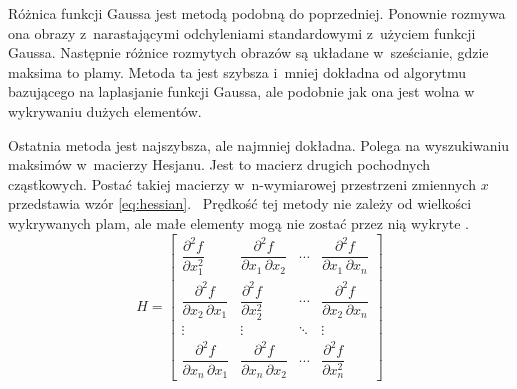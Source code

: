 Różnica funkcji Gaussa jest metodą podobną do poprzedniej.
Ponownie rozmywa ona obrazy z~narastającymi odchyleniami standardowymi z~użyciem
funkcji Gaussa.
Następnie różnice rozmytych obrazów są układane w~sześcianie, gdzie maksima to
plamy.
Metoda ta jest szybsza i~mniej dokładna od algorytmu bazującego na laplasjanie
funkcji Gaussa, ale podobnie jak ona jest wolna w wykrywaniu dużych elementów.

Ostatnia metoda jest najszybsza, ale najmniej dokładna.
Polega na wyszukiwaniu maksimów w~macierzy Hesjanu.
Jest to macierz drugich pochodnych cząstkowych.
Postać takiej macierzy w~n-wymiarowej przestrzeni zmiennych $ x $ przedstawia
wzór \ref{eq:hessian}.~%
Prędkość tej metody nie zależy od wielkości wykrywanych plam, ale małe elementy
mogą nie zostać przez nią wykryte \cite{scikit_reference}.
\begin{equation}
    H = \begin{bmatrix}
        \dfrac{\partial^2 f}{\partial x_1^2} &
        \dfrac{\partial^2 f}{\partial x_1\,\partial x_2} &
        \cdots & \dfrac{\partial^2 f}{\partial x_1\,\partial x_n} \\[2.2ex]
        \dfrac{\partial^2 f}{\partial x_2\,\partial x_1} &
        \dfrac{\partial^2 f}{\partial x_2^2} &
        \cdots & \dfrac{\partial^2 f}{\partial x_2\,\partial x_n} \\[2.2ex]
        \vdots & \vdots & \ddots & \vdots \\[2.2ex]
        \dfrac{\partial^2 f}{\partial x_n\,\partial x_1} &
        \dfrac{\partial^2 f}{\partial x_n\,\partial x_2} &
        \cdots &
        \dfrac{\partial^2 f}{\partial x_n^2}
    \end{bmatrix}
    \label{eq:hessian}
\end{equation}

